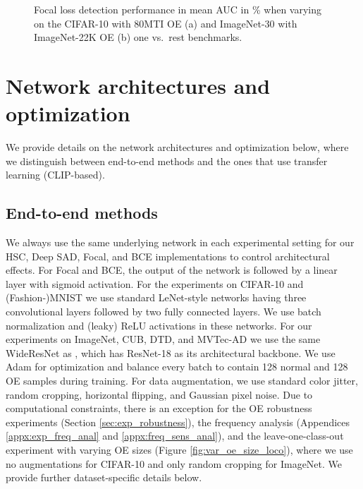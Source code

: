 \documentclass[10pt]{article} \usepackage[accepted]{stylefiles/tmlr}
\begin{document}
\begin{figure}[htb]
  \centering \small
  \caption{Focal loss detection performance in mean AUC in \% when varying  on the CIFAR-10 with 80MTI OE (a) and ImageNet-30 with ImageNet-22K OE (b) one vs.~rest benchmarks.}
  \label{fig:focal_sensitivity}
\end{figure}








\section{Network architectures and optimization}
\label{appx:architectures}
We provide details on the network architectures and optimization below, where we distinguish between end-to-end methods and the ones that use transfer learning (CLIP-based). 

\subsection{End-to-end methods}
We always use the same underlying network  in each experimental setting for our HSC, Deep SAD, Focal, and BCE implementations to control architectural effects. 
For Focal and BCE, the output of the network  is followed by a linear layer with sigmoid activation. 
For the experiments on CIFAR-10 and (Fashion-)MNIST we use standard LeNet-style networks \citep{lecun1990handwritten} having three convolutional layers followed by two fully connected layers. 
We use batch normalization \citep{ioffe2015} and (leaky) ReLU activations in these networks. 
For our experiments on ImageNet, CUB, DTD, and MVTec-AD we use the same WideResNet \citep{zagoruyko2016wide} as \citet{hendrycks2019using}, which has ResNet-18 as its architectural backbone. 
We use Adam \citep{kingma2014} for optimization and balance every batch to contain 128 normal and 128 OE samples during training. 
For data augmentation, we use standard color jitter, random cropping, horizontal flipping, and Gaussian pixel noise.
Due to computational constraints, there is an exception for the OE robustness experiments (Section \ref{sec:exp_robustness}), the frequency analysis (Appendices \ref{appx:exp_freq_anal} and \ref{appx:freq_sens_anal}), and the leave-one-class-out experiment with varying OE sizes (Figure \ref{fig:var_oe_size_loco}), where we use no augmentations for CIFAR-10 and only random cropping for ImageNet. 
We provide further dataset-specific details below.
\end{document}
